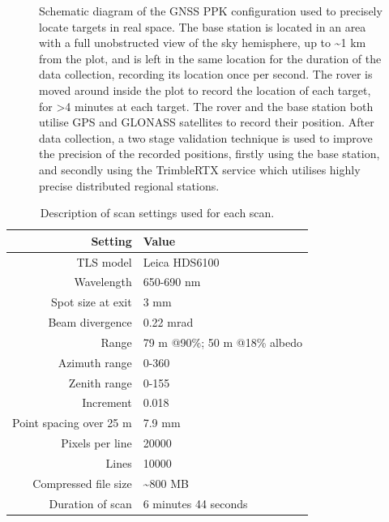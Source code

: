 \begin{refsection}
\begin{figure}
	\caption[Schematic diagram of GNSS PPK configuration]{Schematic diagram of the GNSS PPK configuration used to precisely locate targets in real space. The base station is located in an area with a full unobstructed view of the sky hemisphere, up to \textasciitilde{}1 km from the plot, and is left in the same location for the duration of the data collection, recording its location once per second. The rover is moved around inside the plot to record the location of each target, for >4 minutes at each target. The rover and the base station both utilise GPS and GLONASS satellites to record their position. After data collection, a two stage validation technique is used to improve the precision of the recorded positions, firstly using the base station, and secondly using the TrimbleRTX service which utilises highly precise distributed regional stations.}
	\label{workflow:ppk}
\end{figure}

\begin{table} 
	\centering 
\caption[Description of scan settings]{Description of scan settings used for each scan.} 
  \label{workflow:scan_settings} 
\begin{tabular}{rl} 
	\toprule
{Setting} & {Value} \\
	\midrule
TLS model & Leica HDS6100 \\
Wavelength & 650-690 nm \\
Spot size at exit & 3 mm \\
Beam divergence & 0.22 mrad \\
Range & 79 m @90\%; 50 m @18\% albedo \\
Azimuth range & 0-360\textdegree{} \\
Zenith range & 0-155\textdegree{} \\
Increment & 0.018\textdegree{} \\
Point spacing over 25 m & 7.9 mm \\
Pixels per line & \num{20000} \\
Lines & \num{10000} \\
Compressed file size & \textasciitilde{}800 MB \\
Duration of scan & 6 minutes 44 seconds \\
	\bottomrule
\end{tabular} 
\end{table} 



\end{refsection}
